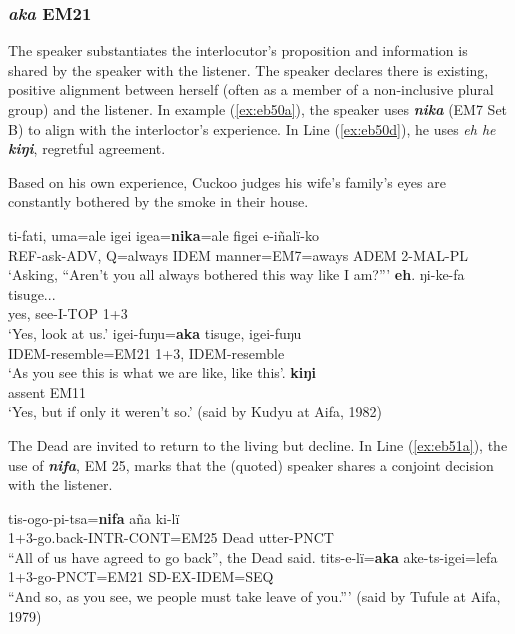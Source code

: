\documentclass[output=paper]{langsci/langscibook}
\begin{document}
\subsubsection{\textit{aka} EM21} The speaker substantiates the interlocutor’s  proposition and information is shared by the speaker with the listener.  The speaker declares there is existing, positive alignment between herself (often as a member of a non-inclusive plural group) and the listener.  In example (\ref{ex:eb50a}), the speaker uses \textbf{\textit{nika}} (EM7 Set B) to align with the interloctor’s experience.
In Line (\ref{ex:eb50d}), he uses \textit{eh he \textbf{kiŋi}}, regretful agreement.

Based on his  own experience, Cuckoo judges his wife’s family’s eyes are constantly bothered by the smoke in their house. 

\begin{exe}
\ex \label{ex:eb50}
	\begin{xlist}
	\ex \label{ex:eb50a}
	\gll ti-fati, uma=ale igei igea=\textbf{nika}=ale figei e-iñalï-ko\\
	REF-ask-ADV, Q=always IDEM manner=EM7=aways ADEM 2-MAL-PL\\
	\trans ‘Asking,  “Aren’t you all always bothered this way like I am?”’
	\ex \label{ex:eb50b}
	\gll \textbf{eh}. ŋi-ke-fa tisuge...\\
	yes, see-I-TOP 1+3\\
	\trans ‘Yes, look at us.’
	\ex \label{ex:eb50c}
	\gll igei-fuŋu=\textbf{aka} tisuge, igei-fuŋu\\
	IDEM-resemble=EM21 1+3, IDEM-resemble\\
	\trans ‘As you see this is what we are like, like this’. 
	\ex \label{ex:eb50d}
	 \textbf{kiŋi}\\
	assent EM11\\
	\trans ‘Yes, but if only it weren’t so.’ (said by Kudyu at Aifa, 1982)
\end{xlist}
\end{exe}

The Dead are invited to return to the living but decline. In Line (\ref{ex:eb51a}), the  use of \textbf{\textit{nifa}}, EM 25, marks that the (quoted) speaker shares a conjoint decision  with the listener.

\begin{exe}
\ex \label{ex:eb51}
	\begin{xlist}
	\ex \label{ex:eb51a}
	\gll tis-ogo-pi-tsa=\textbf{nifa} aña ki-lï\\
	1+3-go.back-INTR-CONT=EM25 Dead utter-PNCT\\
	\trans “All of us have agreed to go back”, the Dead said.
	\ex \label{ex:eb51b}
	\gll tits-e-lï=\textbf{aka} ake-ts-igei=lefa\\
	1+3-go-PNCT=EM21 SD-EX-IDEM=SEQ\\
	\trans “And so, as you see, we people must take leave of you.”’ (said by Tufule at Aifa, 1979)
\end{xlist}
\end{exe}
\end{document}
